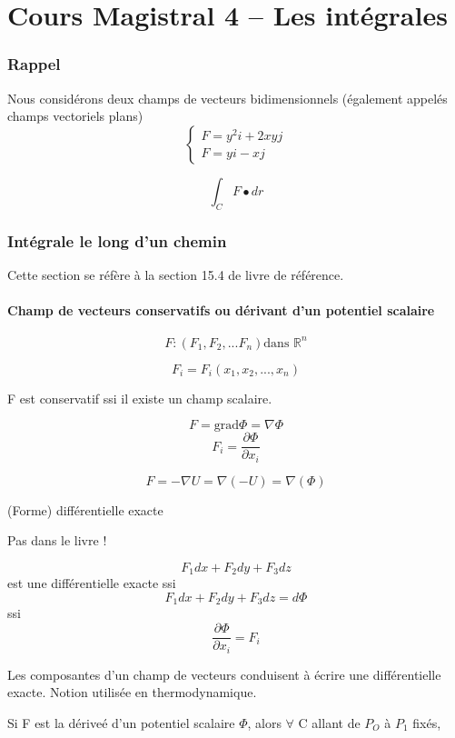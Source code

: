 \part{Cours Magistral 4 -- Les intégrales}
\section{Rappel}

Nous considérons deux champs de vecteurs bidimensionnels (également appelés champs vectoriels plans)
$$
\left\{
\begin{array}{c}
F=y^2i+2xyj\\
F = yi-xj
\end{array}
\right.
$$

\[\int_C F\bullet dr \]

\section{Intégrale le long d'un chemin}
Cette section se réfère à la section 15.4 de livre de référence.

\subsection{Champ de vecteurs conservatifs ou dérivant d'un potentiel scalaire}

\[F:(F_1,F_2,...F_n)\text{dans } \mathbb{R}^n\]

\[F_i=F_i(x_1,x_2,...,x_n)\]

F est conservatif ssi il existe un champ scalaire.

\[F=\text{grad}\Phi = \nabla \Phi\]
\[F_i=\frac{\partial \Phi}{\partial x_i}\]
\begin{myrem}
\[F=-\nabla U = \nabla (- U ) = \nabla ( \Phi ) \]
\end{myrem}

\begin{myrem}{(Forme) différentielle exacte}

Pas dans le livre !

\[F_1 dx +F_2 dy + F_3 dz \] est une différentielle exacte ssi\[F_1 dx +F_2 dy + F_3 dz  = d \Phi\]
ssi
\[\frac{\partial \Phi}{\partial x_i} = F_i\]
\end{myrem}

Les composantes d'un champ de vecteurs conduisent à écrire une différentielle exacte. Notion utilisée en thermodynamique.

Si F est la dériveé d'un potentiel scalaire $\Phi$, alors $\forall$ C allant de $P_O$ à $P_1$ fixés,


